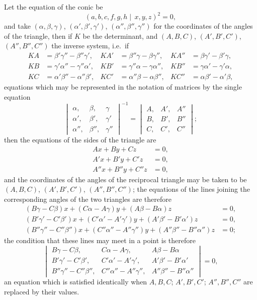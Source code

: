 \documentclass[12pt,a4paper]{article}
\theoremstyle{plain}
\begin{document}
Let the equation of the conic be
\[
(a,b,c,f,g,h \mid\!\, x,y,z)^2 = 0,
\]
and take $(\alpha,\beta,\gamma)$, $(\alpha',\beta',\gamma')$, $(\alpha'',\beta'',\gamma'')$ for the coordinates of the angles of the triangle, then if $K$ be the determinant, and $(A,B,C)$, $(A',B',C')$, $(A'',B'',C'')$ the inverse system, i.e.\ if
\begin{align*}
KA &= \beta'\gamma'' - \beta''\gamma', & KA' &= \beta''\gamma - \beta\gamma'', & KA'' &= \beta\gamma' - \beta'\gamma, \\
KB &= \gamma'\alpha'' - \gamma''\alpha', & KB' &= \gamma''\alpha - \gamma\alpha'', & KB'' &= \gamma\alpha' - \gamma'\alpha, \\
KC &= \alpha'\beta'' - \alpha''\beta', & KC' &= \alpha''\beta - \alpha\beta'', & KC'' &= \alpha\beta' - \alpha'\beta,
\end{align*}
equations which may be represented in the notation of matrices by the single equation
\[
\begin{vmatrix}
\alpha, & \beta, & \gamma \\
\alpha', & \beta', & \gamma' \\
\alpha'', & \beta'', & \gamma''
\end{vmatrix}^{-1}
= \begin{vmatrix}
A, & A', & A'' \\
B, & B', & B'' \\
C, & C', & C''
\end{vmatrix};
\]
then the equations of the sides of the triangle are
\begin{align*}
Ax + By + Cz &= 0, \\
A'x + B'y + C'z &= 0, \\
A''x + B''y + C''z &= 0,
\end{align*}
and the coordinates of the angles of the reciprocal triangle may be taken to be $(A,B,C)$, $(A',B',C')$, $(A'',B'',C'')$; the equations of the lines joining the corresponding angles of the two triangles are therefore
\begin{align*}
(B\gamma - C\beta)x + (C\alpha - A\gamma)y + (A\beta - B\alpha)z &= 0, \\
(B'\gamma' - C'\beta')x + (C'\alpha' - A'\gamma')y + (A'\beta' - B'\alpha')z &= 0, \\
(B''\gamma'' - C''\beta'')x + (C''\alpha'' - A''\gamma'')y + (A''\beta'' - B''\alpha'')z &= 0;
\end{align*}
the condition that these lines may meet in a point is therefore
\[
\begin{vmatrix}
B\gamma - C\beta, & C\alpha - A\gamma, & A\beta - B\alpha \\
B'\gamma' - C'\beta', & C'\alpha' - A'\gamma', & A'\beta' - B'\alpha' \\
B''\gamma'' - C''\beta'', & C''\alpha'' - A''\gamma'', & A''\beta'' - B''\alpha''
\end{vmatrix}
= 0,
\]
an equation which is satisfied identically when $A,B,C$; $A',B',C'$; $A'',B'',C''$ are replaced by their values.
\end{document}
